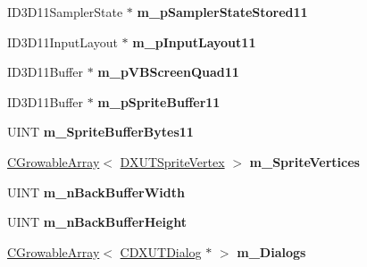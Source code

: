 \begin{DoxyCompactItemize}
\item 
\hypertarget{class_c_d_x_u_t_dialog_resource_manager_af58595e0331146d18c0ce480da9694d1}{I\+D3\+D11\+Sampler\+State $\ast$ {\bfseries m\+\_\+p\+Sampler\+State\+Stored11}}\label{class_c_d_x_u_t_dialog_resource_manager_af58595e0331146d18c0ce480da9694d1}

\item 
\hypertarget{class_c_d_x_u_t_dialog_resource_manager_a6345cb0f0c21dc7ba0cbb5c8435e0bf2}{I\+D3\+D11\+Input\+Layout $\ast$ {\bfseries m\+\_\+p\+Input\+Layout11}}\label{class_c_d_x_u_t_dialog_resource_manager_a6345cb0f0c21dc7ba0cbb5c8435e0bf2}

\item 
\hypertarget{class_c_d_x_u_t_dialog_resource_manager_a163d1a3c7a76f9ad662b97f637889706}{I\+D3\+D11\+Buffer $\ast$ {\bfseries m\+\_\+p\+V\+B\+Screen\+Quad11}}\label{class_c_d_x_u_t_dialog_resource_manager_a163d1a3c7a76f9ad662b97f637889706}

\item 
\hypertarget{class_c_d_x_u_t_dialog_resource_manager_aabcf1fa0c4c1353879fbc9843cd9cbd9}{I\+D3\+D11\+Buffer $\ast$ {\bfseries m\+\_\+p\+Sprite\+Buffer11}}\label{class_c_d_x_u_t_dialog_resource_manager_aabcf1fa0c4c1353879fbc9843cd9cbd9}

\item 
\hypertarget{class_c_d_x_u_t_dialog_resource_manager_aa82556b238da7ebcbaa247cfc4b35e8b}{U\+I\+N\+T {\bfseries m\+\_\+\+Sprite\+Buffer\+Bytes11}}\label{class_c_d_x_u_t_dialog_resource_manager_aa82556b238da7ebcbaa247cfc4b35e8b}

\item 
\hypertarget{class_c_d_x_u_t_dialog_resource_manager_a8f4ef2026ebe886ed663df820ae182ff}{\hyperlink{class_c_growable_array}{C\+Growable\+Array}$<$ \hyperlink{struct_d_x_u_t_sprite_vertex}{D\+X\+U\+T\+Sprite\+Vertex} $>$ {\bfseries m\+\_\+\+Sprite\+Vertices}}\label{class_c_d_x_u_t_dialog_resource_manager_a8f4ef2026ebe886ed663df820ae182ff}

\item 
\hypertarget{class_c_d_x_u_t_dialog_resource_manager_abf20c98eb3edc4c63ec0ec658a4c681e}{U\+I\+N\+T {\bfseries m\+\_\+n\+Back\+Buffer\+Width}}\label{class_c_d_x_u_t_dialog_resource_manager_abf20c98eb3edc4c63ec0ec658a4c681e}

\item 
\hypertarget{class_c_d_x_u_t_dialog_resource_manager_a1d8eb313d4d3f5ecec718a2e918ee1ed}{U\+I\+N\+T {\bfseries m\+\_\+n\+Back\+Buffer\+Height}}\label{class_c_d_x_u_t_dialog_resource_manager_a1d8eb313d4d3f5ecec718a2e918ee1ed}

\item 
\hypertarget{class_c_d_x_u_t_dialog_resource_manager_a3b9c840e8111159b84b0cdb4301a1eaa}{\hyperlink{class_c_growable_array}{C\+Growable\+Array}$<$ \hyperlink{class_c_d_x_u_t_dialog}{C\+D\+X\+U\+T\+Dialog} $\ast$ $>$ {\bfseries m\+\_\+\+Dialogs}}\label{class_c_d_x_u_t_dialog_resource_manager_a3b9c840e8111159b84b0cdb4301a1eaa}

\end{DoxyCompactItemize}
